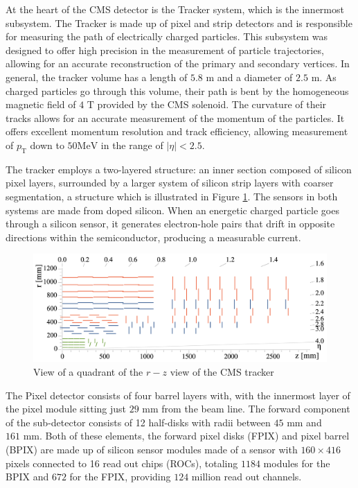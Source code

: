 At the heart of the CMS detector is the Tracker system, which is the innermost subsystem. The Tracker is made up of pixel and strip detectors and is responsible for measuring the path of electrically charged particles. This subsystem was designed to offer high precision in the measurement of particle trajectories, allowing for an accurate reconstruction of the primary and secondary vertices. In general, the tracker volume has a length of $5.8 \text{ m}$ and a diameter of $2.5 \text{ m}$. As charged particles go through this volume, their path is bent by the homogeneous magnetic field of $4 \text{ T}$ provided by the CMS solenoid. The curvature of their tracks allows for an accurate measurement of the momentum of the particles. It offers excellent momentum resolution and track efficiency, allowing measurement of $p_{\text{T}}$ down to $50 \text{MeV}$ in the range of $|\eta| < 2.5$. 

The tracker employs a two-layered structure: an inner section composed of silicon pixel layers, surrounded by a larger system of silicon strip layers with coarser segmentation, a structure which is illustrated in Figure \ref{fig:trackquad}. The sensors in both systems are made from doped silicon. When an energetic charged particle goes through a silicon sensor, it generates electron-hole pairs that drift in opposite directions within the semiconductor, producing a measurable current.

\begin{figure}
    \centering
    \includegraphics[width=0.85\linewidth]{images/trackquadrant.png}
    \caption{View of a quadrant of the $r-z$ view of the CMS tracker \cite{CERN-LHCC-2017-009}}
    \label{fig:trackquad}
\end{figure}

The Pixel detector consists of four barrel layers with, with the innermost layer of the pixel module sitting just $29 \text{ mm}$ from the beam line. The forward component of the sub-detector consists of 12 half-disks with radii between $45 \text{ mm}$ and $161 \text{ mm}$. Both of these elements, the forward pixel disks (FPIX) and pixel barrel (BPIX) are made up of silicon sensor modules made of a sensor with $160\times416$ pixels connected to 16 read out chips (ROCs), totaling $1184$ modules for the BPIX and $672$ for the FPIX, providing $124$ million read out channels. 

